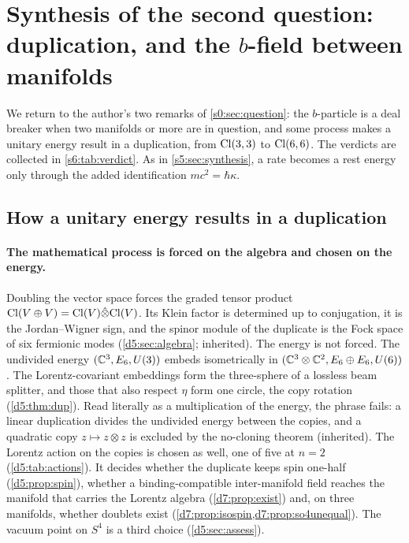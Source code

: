 \section{Synthesis of the second question: duplication, and the \texorpdfstring{$b$}{b}-field between manifolds}
\label{s6:sec:synthesis}

We return to the author's two remarks of \cref{s0:sec:question}: the $b$-particle is a deal breaker when two manifolds or more are in
question, and some process makes a unitary energy result in a duplication, from $\mathrm{Cl}(3,3)$ to $\mathrm{Cl}(6,6)$. The verdicts are collected in
\cref{s6:tab:verdict}. As in \cref{s5:sec:synthesis}, a rate becomes a rest energy only through the added identification $mc^2=\hbar\kappa$.

\subsection{How a unitary energy results in a duplication}

\paragraph{The mathematical process is forced on the algebra and chosen on the energy.} Doubling the vector space forces the graded tensor
product $\mathrm{Cl}(V\oplus V)=\mathrm{Cl}(V)\hat\otimes\mathrm{Cl}(V)$. Its Klein factor is determined up to conjugation, it is the Jordan--Wigner sign, and the
spinor module of the duplicate is the Fock space of six fermionic modes (\cref{d5:sec:algebra}; inherited). The energy is not forced. The
undivided energy $(\mathbb{C}^3,E_6,U(3))$ embeds isometrically in $(\mathbb{C}^3\otimes\mathbb{C}^2,E_6\oplus E_6,U(6))$. The Lorentz-covariant embeddings form the
three-sphere of a lossless beam splitter, and those that also respect $\eta$ form one circle, the copy rotation (\cref{d5:thm:dup}). Read
literally as a multiplication of the energy, the phrase fails: a linear duplication divides the undivided energy between the copies, and a
quadratic copy $z\mapsto z\otimes z$ is excluded by the no-cloning theorem (inherited). The Lorentz action on the copies is chosen as well, one of five at $n=2$ (\cref{d5:tab:actions}). It decides whether the duplicate keeps spin one-half (\cref{d5:prop:spin}), whether a binding-compatible inter-manifold field reaches the manifold that carries the Lorentz algebra (\cref{d7:prop:exist}) and, on three manifolds, whether doublets exist (\cref{d7:prop:isospin,d7:prop:so4unequal}). The vacuum point on $S^4$ is a third choice (\cref{d5:sec:assess}).

